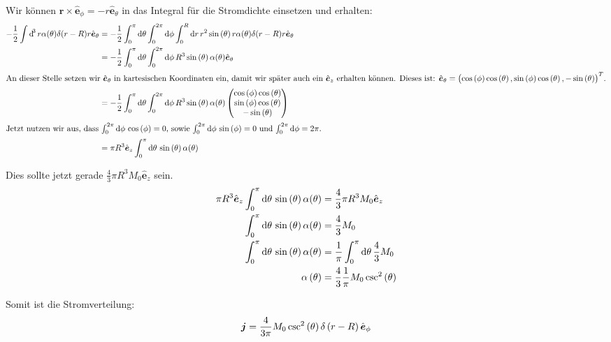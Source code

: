 \documentclass[11pt, ngerman, fleqn]{article}
\newcommand{\ev}{\hat{\vec e}}
\newcommand{\half}{\frac 12}
\renewcommand{\vec}[1]{\boldsymbol{#1}}
\begin{document}
Wir können $\vec r \times \ev_\phi = - r \ev_\theta$ in das Integral für die
Stromdichte einsetzen und erhalten:
\begin{align*}
	- \half \int \dif^3 r \alpha(\theta) \delta(r-R) r \ev_\theta
	&= - \half \int_0^\pi \dif \theta \int_0^{2 \pi} \dif \phi \int_0^R \dif r \, r^2 \sin\del\theta r \alpha(\theta) \delta(r-R) r \ev_\theta \\
	&= - \half \int_0^\pi \dif \theta \int_0^{2 \pi} \dif \phi \, R^3 \sin\del\theta \alpha(\theta) \ev_\theta \\
	\intertext{An dieser Stelle setzen wir $\ev_\theta$ in kartesischen Koordinaten ein, damit wir später auch ein $\ev_z$ erhalten können. Dieses ist: $\ev_\theta = \del{\cos\del\phi \cos\del\theta, \sin\del\phi \cos\del\theta, - \sin\del\theta}^T$.}
	&= - \half \int_0^\pi \dif \theta \int_0^{2 \pi} \dif \phi \, R^3 \sin\del\theta \alpha(\theta) \begin{pmatrix}
		\cos\del\phi \cos\del\theta \\ \sin\del\phi \cos\del\theta \\ - \sin\del\theta
	\end{pmatrix} \\
	\intertext{Jetzt nutzen wir aus, dass $\int_0^{2\pi} \dif \phi \, \cos\del\phi = 0$, sowie $\int_0^{2\pi} \dif \phi \, \sin\del\phi = 0$ und $\int_0^{2\pi} \dif \phi = 2\pi$.}
	&= \pi R^3 \ev_z \int_0^\pi \dif \theta \, \sin\del\theta \alpha(\theta)
\end{align*}

Dies sollte jetzt gerade $\frac 43 \pi R^3 M_0 \ev_z$ sein.
\begin{align*}
	\pi R^3 \ev_z \int_0^\pi \dif \theta \, \sin\del\theta \alpha(\theta) &= \frac 43 \pi R^3 M_0 \ev_z \\
	\int_0^\pi \dif \theta \, \sin\del\theta \alpha(\theta) &= \frac 43 M_0 \\
	\int_0^\pi \dif \theta \, \sin\del\theta \alpha(\theta) &= \frac 1\pi \int_0^\pi \dif \theta \, \frac 43 M_0 \\
	\alpha\del\theta &= \frac 43 \frac 1\pi M_0 \csc^2\del\theta
\end{align*}

Somit ist die Stromverteilung:
\[
	\vec j = \frac 4{3\pi} M_0 \csc^2\del\theta \delta\del{r-R} \ev_\phi
\]

\end{document}
